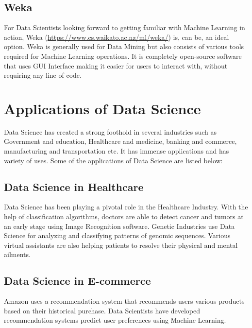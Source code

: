 \documentclass[
]{book}
\begin{document}
\hypertarget{weka}{%
\subsection*{Weka}\label{weka}}


For Data Scientists looking forward to getting familiar with Machine Learning in action, Weka (\url{https://www.cs.waikato.ac.nz/ml/weka/}) is, can be, an ideal option. Weka is generally used for Data Mining but also consists of various tools required for Machine Learning operations. It is completely open-source software that uses GUI Interface making it easier for users to interact with, without requiring any line of code.

\hypertarget{applications-of-data-science}{%
\section{Applications of Data Science}\label{applications-of-data-science}}

Data Science has created a strong foothold in several industries such as Government and education, Healthcare and medicine, banking and commerce, manufacturing and transportation etc. It has immense applications and has variety of uses. Some of the applications of Data Science are listed below:

\hypertarget{data-science-in-healthcare}{%
\subsection*{Data Science in Healthcare}\label{data-science-in-healthcare}}


Data Science has been playing a pivotal role in the Healthcare Industry. With the help of classification algorithms, doctors are able to detect cancer and tumors at an early stage using Image Recognition software. Genetic Industries use Data Science for analyzing and classifying patterns of genomic sequences. Various virtual assistants are also helping patients to resolve their physical and mental ailments.

\hypertarget{data-science-in-e-commerce}{%
\subsection*{Data Science in E-commerce}\label{data-science-in-e-commerce}}


Amazon uses a recommendation system that recommends users various products based on their historical purchase. Data Scientists have developed recommendation systems predict user preferences using Machine Learning.
\end{document}
